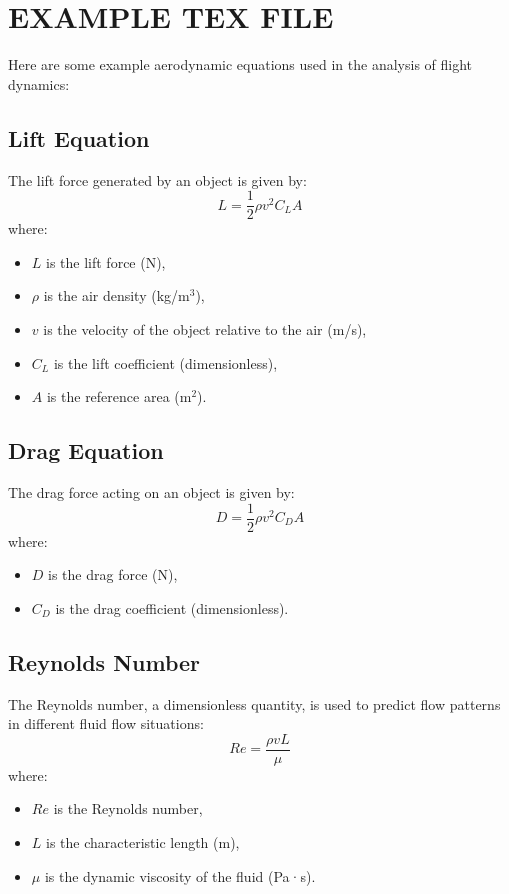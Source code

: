 \documentclass{article}
\begin{document}
\section{EXAMPLE TEX FILE}
Here are some example aerodynamic equations used in the analysis of flight dynamics:

\subsection{Lift Equation}
The lift force generated by an object is given by:
\begin{equation}
    L = \frac{1}{2} \rho v^2 C_L A
\end{equation}
where:
\begin{itemize}
    \item $L$ is the lift force (N),
    \item $\rho$ is the air density (kg/m\(^3\)),
    \item $v$ is the velocity of the object relative to the air (m/s),
    \item $C_L$ is the lift coefficient (dimensionless),
    \item $A$ is the reference area (m\(^2\)).
\end{itemize}

\subsection{Drag Equation}
The drag force acting on an object is given by:
\begin{equation}
    D = \frac{1}{2} \rho v^2 C_D A
\end{equation}
where:
\begin{itemize}
    \item $D$ is the drag force (N),
    \item $C_D$ is the drag coefficient (dimensionless).
\end{itemize}

\subsection{Reynolds Number}
The Reynolds number, a dimensionless quantity, is used to predict flow patterns in different fluid flow situations:
\begin{equation}
    Re = \frac{\rho v L}{\mu}
\end{equation}
where:
\begin{itemize}
    \item $Re$ is the Reynolds number,
    \item $L$ is the characteristic length (m),
    \item $\mu$ is the dynamic viscosity of the fluid (Pa·s).
\end{itemize}
\end{document}

